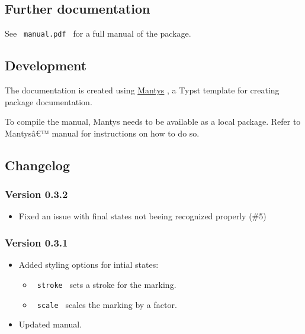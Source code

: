 \subsection{Further documentation}\label{further-documentation}

See \texttt{\ manual.pdf\ } for a full manual of the package.

\subsection{Development}\label{development}

The documentation is created using
\href{https://github.com/jneug/typst-mantys}{Mantys} , a Typst template
for creating package documentation.

To compile the manual, Mantys needs to be available as a local package.
Refer to Mantysâ€™ manual for instructions on how to do so.

\subsection{Changelog}\label{changelog}

\subsubsection{Version 0.3.2}\label{version-0.3.2}

\begin{itemize}
\tightlist
\item
  Fixed an issue with final states not beeing recognized properly (\#5)
\end{itemize}

\subsubsection{Version 0.3.1}\label{version-0.3.1}

\begin{itemize}
\tightlist
\item
  Added styling options for intial states:

  \begin{itemize}
  \tightlist
  \item
    \texttt{\ stroke\ } sets a stroke for the marking.
  \item
    \texttt{\ scale\ } scales the marking by a factor.
  \end{itemize}
\item
  Updated manual.
\end{itemize}

